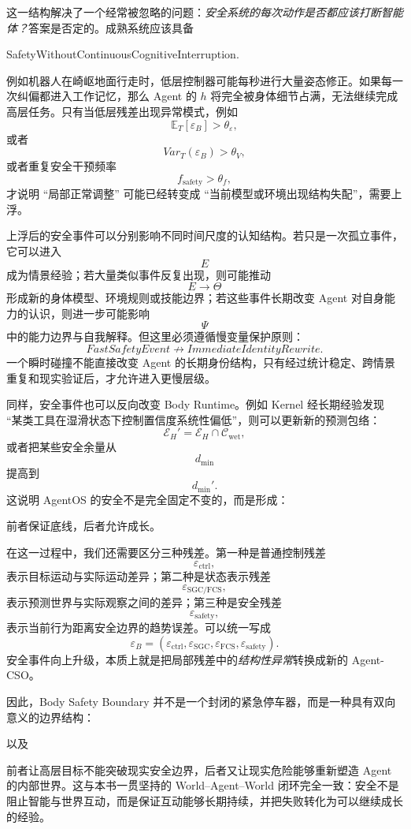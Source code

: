 这一结构解决了一个经常被忽略的问题：\emph{安全系统的每次动作是否都应该打断智能体？}答案是否定的。成熟系统应该具备
\begin{statementbox}
SafetyWithoutContinuousCognitiveInterruption.
\end{statementbox}
例如机器人在崎岖地面行走时，低层控制器可能每秒进行大量姿态修正。如果每一次纠偏都进入工作记忆，那么 Agent 的 $h$ 将完全被身体细节占满，无法继续完成高层任务。只有当低层残差出现异常模式，例如
\[
\mathbb E_T[\varepsilon_B]
>
\theta_\varepsilon,
\]
或者
\[
Var_T(\varepsilon_B)
>
\theta_V,
\]
或者重复安全干预频率
\[
f_{\mathrm{safety}}
>
\theta_f,
\]
才说明 ``局部正常调整'' 可能已经转变成 ``当前模型或环境出现结构失配''，需要上浮。

上浮后的安全事件可以分别影响不同时间尺度的认知结构。若只是一次孤立事件，它可以进入
\[
E
\]
成为情景经验；若大量类似事件反复出现，则可能推动
\[
E\rightarrow\Theta
\]
形成新的身体模型、环境规则或技能边界；若这些事件长期改变 Agent 对自身能力的认识，则进一步可能影响
\[
\Psi
\]
中的能力边界与自我解释。但这里必须遵循慢变量保护原则：
\[
FastSafetyEvent
\nrightarrow
ImmediateIdentityRewrite.
\]
一个瞬时碰撞不能直接改变 Agent 的长期身份结构，只有经过统计稳定、跨情景重复和现实验证后，才允许进入更慢层级。

同样，安全事件也可以反向改变 Body Runtime。例如 Kernel 经长期经验发现 ``某类工具在湿滑状态下控制置信度系统性偏低''，则可以更新新的预测包络：
\[
\mathcal E_H'
=
\mathcal E_H
\cap
\mathcal C_{\mathrm{wet}},
\]
或者把某些安全余量从
\[
d_{\min}
\]
提高到
\[
d_{\min}'.
\]
这说明 AgentOS 的安全不是完全固定不变的，而是形成：
\begin{statementbox}
\centering
{}
\end{statementbox}
前者保证底线，后者允许成长。

在这一过程中，我们还需要区分三种残差。第一种是普通控制残差
\[
\varepsilon_{\mathrm{ctrl}},
\]
表示目标运动与实际运动差异；第二种是状态表示残差
\[
\varepsilon_{\mathrm{SGC/FCS}},
\]
表示预测世界与实际观察之间的差异；第三种是安全残差
\[
\varepsilon_{\mathrm{safety}},
\]
表示当前行为距离安全边界的趋势误差。可以统一写成
\[
\varepsilon_B
=
(
\varepsilon_{\mathrm{ctrl}},
\varepsilon_{\mathrm{SGC}},
\varepsilon_{\mathrm{FCS}},
\varepsilon_{\mathrm{safety}}
).
\]
安全事件向上升级，本质上就是把局部残差中的\emph{结构性异常}转换成新的 Agent-CSO。

因此，Body Safety Boundary 并不是一个封闭的紧急停车器，而是一种具有双向意义的边界结构：
\begin{statementbox}
\centering
{}
\end{statementbox}
以及
\begin{statementbox}
\centering
{}
\end{statementbox}
前者让高层目标不能突破现实安全边界，后者又让现实危险能够重新塑造 Agent 的内部世界。这与本书一贯坚持的 World--Agent--World 闭环完全一致：安全不是阻止智能与世界互动，而是保证互动能够长期持续，并把失败转化为可以继续成长的经验。

